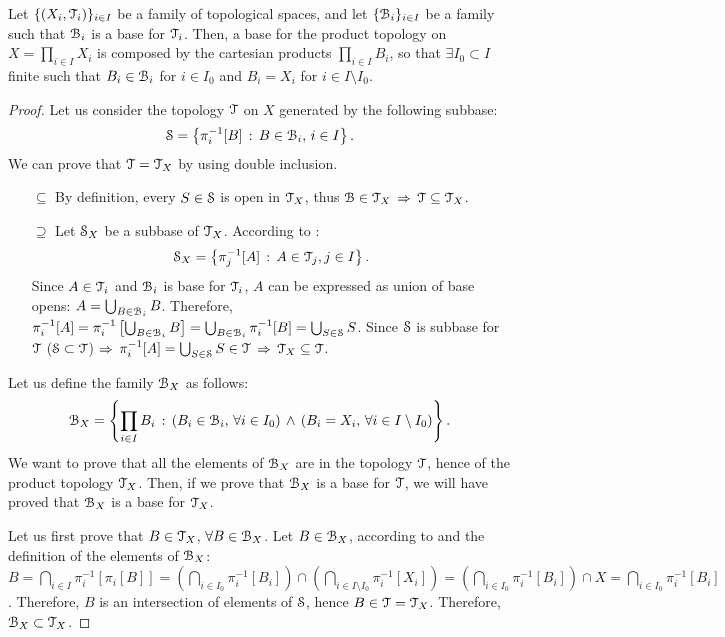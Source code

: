 \begin{theorem}
	\label{th:product-topology-base}
	Let $\{(X_i, \T_i)\}_{i\in I}$ be a family of topological spaces, and let $\{\B_i\}_{i\in I}$ be
	a family such that $\B_i$ is a base for $\T_i$. Then, a base for the product topology
	on $X=\prod_{i\in I} X_i$ is composed by the cartesian products $\prod_{i\in I}B_i$,
	so that $\exists I_0\subset I$ finite such that
	$B_i\in \B_i$ for $i\in I_0$ and $B_i=X_i$ for $i\in I\setminus I_0$.
\end{theorem}

\begin{proof}Let us consider the topology $\T$ on $X$ generated by the following subbase:
	$$
	\S = \setdef{\pi^{-1}_i[B]}{B\in\B_i,\,i\in I}.
	$$
	We can prove that $\T=\T_X$ by using double inclusion.
	\begin{itemize}
		\item[$\boxed{\subseteq}$] By definition, every $S\in \S$ is open in $\T_X$, thus $\B\in \T_X$ $\Then$ $\T\subseteq \T_X$.
		\item[$\boxed{\supseteq}$] Let $\S_X$ be a subbase of $\T_X$. According to :
		$$
			\S_X = \setdef{\pi^{-1}_j[A]}{A\in\T_j, j\in I}.
		$$
		Since $A\in \T_i$ and $\B_i$ is base for $\T_i$, $A$ can be expressed as union of
		base opens: $A=\bigcup_{B\in \B_i} B$. Therefore,
		$\pi^{-1}_i[A] = \pi^{-1}_i\left[\bigcup_{B\in \B_i} B\right] = \bigcup_{B\in \B_i} \pi^{-1}_i[B] = \bigcup_{S\in\S}S$.
		Since $\S$ is subbase for $\T$ ($\S\subset \T$) $\Then$ $\pi^{-1}_i[A]=\bigcup_{S\in\S}S\in \T$ $\Then$ $\T_X\subseteq \T$.
	\end{itemize}
	Let us define the family $\B_X$ as follows:
	$$
		\B_X = \setdef{\prod_{i\in I}B_i}{\left(B_i\in\B_i,\,\forall i\in I_0\right)\,\land\,\left(B_i=X_i,\,\forall i\in I\setminus I_0\right)}.
	$$
	We want to prove that all the elements of $\B_X$ are in the topology $\T$, hence of the product topology $\T_X$.
	Then, if we prove that $\B_X$ is a base for $\T$, we will have proved that $\B_X$ is a base for $\T_X$.

	Let us first prove that $B\in \T_X$, $\forall B\in \B_X$. Let $B\in\B_X$, according to  and the definition of the elements of $\B_X$:
	$B=\bigcap_{i\in I}\pi^{-1}_i[\pi_i[B]] = \left(\bigcap_{i\in I_0}\pi^{-1}_i[B_i]\right)\cap \left(\bigcap_{i\in I\setminus I_0}\pi^{-1}_i[X_i]\right)=\left(\bigcap_{i\in I_0}\pi^{-1}_i[B_i]\right)\cap X=\bigcap_{i\in I_0} \pi^{-1}_i[B_i]$.
	Therefore, $B$ is an intersection of elements of $\S$, hence $B\in \T = \T_X$. Therefore, $\B_X\subset \T_X$.


\end{proof}
